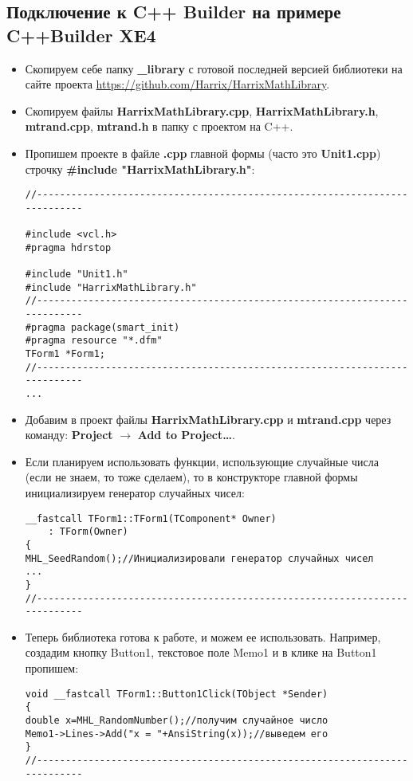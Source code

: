 \documentclass[a4paper,12pt]{article}
\begin{document}
\subsection{Подключение к C++ Builder на примере C++Builder XE4}
\begin{itemize}
\item Скопируем себе папку \textbf{\_library} с готовой последней версией библиотеки на сайте проекта \href{https://github.com/Harrix/HarrixMathLibrary}{https://github.com/Harrix/HarrixMathLibrary}.

\item Скопируем файлы \textbf{HarrixMathLibrary.cpp}, \textbf{HarrixMathLibrary.h}, \textbf{mtrand.cpp}, \textbf{mtrand.h} в папку с проектом на C++.

\item Пропишем проекте в файле \textbf{.cpp} главной формы (часто это \textbf{Unit1.cpp}) строчку \textbf{\#include "HarrixMathLibrary.h"}:
\begin{lstlisting}[label=install_code_04,caption=Подключение библиотеки]
//---------------------------------------------------------------------------

#include <vcl.h>
#pragma hdrstop

#include "Unit1.h"
#include "HarrixMathLibrary.h"
//---------------------------------------------------------------------------
#pragma package(smart_init)
#pragma resource "*.dfm"
TForm1 *Form1;
//---------------------------------------------------------------------------
...
\end{lstlisting}

\item Добавим в проект файлы \textbf{HarrixMathLibrary.cpp} и \textbf{mtrand.cpp} через команду: \textbf{Project} $\rightarrow$ \textbf{Add to Project\dots}.

\item Если планируем использовать функции, использующие случайные числа (если не знаем, то тоже сделаем), то в конструкторе главной формы инициализируем генератор случайных чисел:
\begin{lstlisting}[label=install_code_05,caption=Инициализация генератора случайных чисел]
__fastcall TForm1::TForm1(TComponent* Owner)
	: TForm(Owner)
{
MHL_SeedRandom();//Инициализировали генератор случайных чисел
...
}
//---------------------------------------------------------------------------
\end{lstlisting}

\item Теперь библиотека готова к работе, и можем ее использовать. Например, создадим кнопку Button1, текстовое поле Memo1 и в клике на Button1 пропишем:
\begin{lstlisting}[label=install_code_06,caption=Пример использования]
void __fastcall TForm1::Button1Click(TObject *Sender)
{
double x=MHL_RandomNumber();//получим случайное число
Memo1->Lines->Add("x = "+AnsiString(x));//выведем его
}
//---------------------------------------------------------------------------
\end{lstlisting}
\end{itemize}
\end{document}
